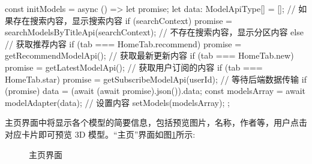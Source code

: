 \begin{JavaScript}
const initModels = async () => {
  let promise;
  let data: ModelApiType[] = [];
  // 如果存在搜索内容，显示搜索内容
  if (searchContext) promise = searchModelsByTitleApi(searchContext);
  // 不存在搜索内容，显示分区内容
  else {
    // 获取推荐内容
    if (tab === HomeTab.recommend) promise = getRecommendModelApi();
    // 获取最新更新内容
    if (tab === HomeTab.new) promise = getLatestModelApi();
    // 获取用户订阅的内容
    if (tab === HomeTab.star) promise = getSubscribeModelApi(userId);
  }
  // 等待后端数据传输
  if (promise) data = (await (await promise).json()).data;
  const modelsArray = await modelAdapter(data);
  // 设置内容
  setModels(modelsArray);
};
\end{JavaScript}

主页界面中将显示各个模型的简要信息，包括预览图片，名称，作者等，用户点击对应卡片即可预览 3D 模型。``主页''界面如图\ref{fig:主页界面}所示:

\begin{figure}[H]
  \small
  \centering
  \caption{主页界面}
  \label{fig:主页界面}
\end{figure}


